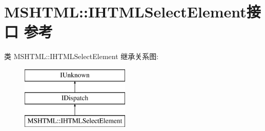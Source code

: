 \hypertarget{interface_m_s_h_t_m_l_1_1_i_h_t_m_l_select_element}{}\section{M\+S\+H\+T\+ML\+:\+:I\+H\+T\+M\+L\+Select\+Element接口 参考}
\label{interface_m_s_h_t_m_l_1_1_i_h_t_m_l_select_element}
类 M\+S\+H\+T\+ML\+:\+:I\+H\+T\+M\+L\+Select\+Element 继承关系图\+:\begin{figure}[H]
\begin{center}
\leavevmode
\includegraphics[height=3.000000cm]{interface_m_s_h_t_m_l_1_1_i_h_t_m_l_select_element}
\end{center}
\end{figure}

